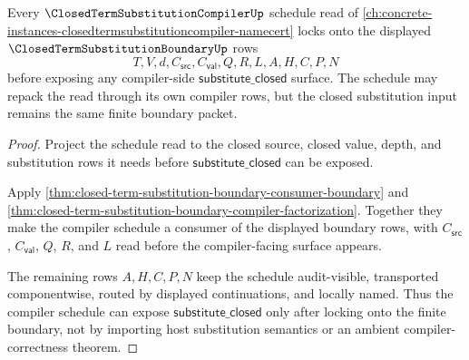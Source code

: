 \begin{theorem}
\label{thm:closed-term-substitution-boundary-compiler-schedule-lock}
Every $\ClosedTermSubstitutionCompilerUp$ schedule read of \autoref{ch:concrete-instances-closedtermsubstitutioncompiler-namecert} locks onto the displayed $\ClosedTermSubstitutionBoundaryUp$ rows
$$
T,V,d,C_{\mathsf{src}},C_{\mathsf{val}},Q,R,L,A,H,C,P,N
$$
before exposing any compiler-side $\mathsf{substitute\_closed}$ surface. The schedule may repack the read through its own compiler rows, but the closed substitution input remains the same finite boundary packet.
\end{theorem}
\begin{proof}
Project the schedule read to the closed source, closed value, depth, and substitution rows it needs before $\mathsf{substitute\_closed}$ can be exposed.

Apply \autoref{thm:closed-term-substitution-boundary-consumer-boundary} and \autoref{thm:closed-term-substitution-boundary-compiler-factorization}. Together they make the compiler schedule a consumer of the displayed boundary rows, with $C_{\mathsf{src}}$, $C_{\mathsf{val}}$, $Q$, $R$, and $L$ read before the compiler-facing surface appears.

The remaining rows $A,H,C,P,N$ keep the schedule audit-visible, transported componentwise, routed by displayed continuations, and locally named. Thus the compiler schedule can expose $\mathsf{substitute\_closed}$ only after locking onto the finite boundary, not by importing host substitution semantics or an ambient compiler-correctness theorem.
\end{proof}

